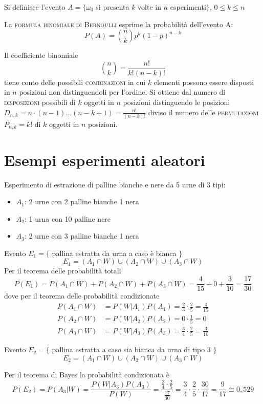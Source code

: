 Si definisce l'evento $A=\lbrace\omega_0$ si presenta $k$ volte in $n$ esperimenti$\rbrace$, $0\leq k\leq n$

La \textsc{formula binomiale di Bernoulli} esprime la probabilità dell'evento A:
\begin{equation}
	P(A)=\binom{n}{k} p^k (1-p)^{n-k}
\end{equation}

Il coefficiente binomiale
\begin{equation}
	\binom{n}{k}=\frac{n!}{k!(n-k)!}
\end{equation}
tiene conto delle possibili \textsc{combinazioni} in cui $k$ elementi possono essere disposti in $n$ posizioni non distinguendoli per l'ordine. Si ottiene dal numero di \textsc{disposizioni} possibili di $k$ oggetti in $n$ posizioni distinguendo le posizioni $D_{n,k}=n\cdot(n-1)\dots(n-k+1)=\frac{n!}{(n-k)!}$ diviso il numero delle \textsc{permutazioni} $P_{n,k}=k!$ di $k$ oggetti in $n$ posizioni.

\section{Esempi esperimenti aleatori}
\begin{esempio}
Esperimento di estrazione di palline bianche e nere da 5 urne di 3 tipi:
\begin{itemize}
	\item $A_1$: 2 urne con 2 palline bianche 1 nera
	\item $A_2$: 1 urna con 10 palline nere
	\item $A_3$: 2 urne con 3 palline bianche 1 nera
\end{itemize}
Evento $E_1=\lbrace$ pallina estratta da urna a caso è bianca $\rbrace$
\[
	E_1=(A_1\cap W)\cup(A_2\cap W)\cup(A_3\cap W)
\]
Per il teorema delle probabilità totali
\[
	P(E_1)=P(A_1\cap W)+P(A_2\cap W)+P(A_3\cap W)=\frac{4}{15}+0+\frac{3}{10}=\frac{17}{30}
\]
dove per il teorema delle probabilità condizionate
\[
\begin{split}
	P(A_1\cap W)&=P(W|A_1) P(A_1)=\frac{2}{3}\cdot\frac{2}{5}=\frac{4}{15}\\
	P(A_2\cap W)&=P(W|A_2) P(A_2)=0\cdot\frac{1}{5}=0\\
	P(A_3\cap W)&=P(W|A_3) P(A_3)=\frac{3}{4}\cdot\frac{2}{5}=\frac{3}{10}
\end{split}
\]

Evento $E_2=\lbrace$ pallina estratta a caso sia bianca da urna di tipo 3 $\rbrace$
\[
	E_2=(A_1\cap W)\cup(A_2\cap W)\cup(A_3\cap W)
\]

Per il teorema di Bayes la probabilità condizionata è
\[
	P(E_2)=P(A_3|W)=\frac{P(W|A_3)P(A_3)}{P(W)}=\frac{\frac{3}{4}\cdot\frac{2}{5}}{\frac{17}{30}}=\frac{3}{4}\cdot\frac{2}{5}\cdot\frac{30}{17}=\frac{9}{17}\cong 0,529
\]
\end{esempio}

